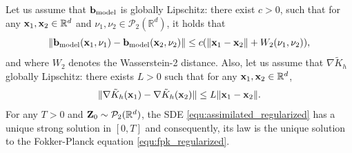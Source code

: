 \begin{proposition}\label{prop:well_possedness}
Let us assume that $\mathbf{b}_{\mathrm{model}}$  is globally Lipschitz: there exist $c>0$, such that for any $\mathbf{x}_1,\mathbf{x}_2 \in \mathbb R^d $ and $\nu_1,\nu_2\in \mathcal P_2 (\mathbb R^d)$, it holds that 
\[
\|\mathbf{b}_{\mathrm{model}}(\mathbf{x}_1,\nu_1)-\mathbf{b}_{\mathrm{model}}(\mathbf{x}_2,\nu_2)\|\leq c(\|\mathbf{x}_1-\mathbf{x}_2\|+W_2(\nu_1,\nu_2)),
\] and 
where $W_2$ denotes the Wasserstein-2 distance. Also, let us assume that $\nabla \tilde{K}_h$ globally Lipschitz: there exists $L>0$ such that for any $\mathbf{x}_1,\mathbf{x}_2\in\mathbb{R}^d$, 
\begin{equation*}
\|\nabla\tilde{K}_h(\mathbf{x}_1)-\nabla\tilde{K}_h(\mathbf{x}_2)\|\leq L\|\mathbf{x}_1-\mathbf{x}_2\|.
\end{equation*}
For any $T>0$ and $ \mathbf{Z}_0\sim \mathcal P_2(\mathbb R^d)$, the SDE \eqref{equ:assimilated_regularized} has a unique strong solution in $[0,T]$ and consequently, its law is the unique solution to the Fokker-Planck equation \eqref{equ:fpk_regularized}.
\end{proposition}


